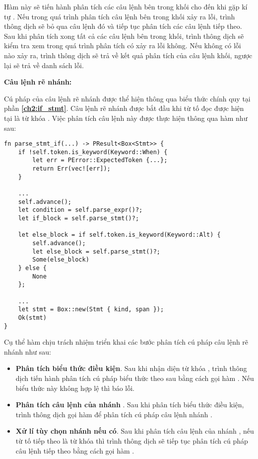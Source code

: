     Hàm này sẽ tiến hành phân tích các câu lệnh bên trong khối cho đến khi gặp kí tự \kw{\}}. Nếu trong quá trình phân tích câu lệnh bên trong khối xảy ra lỗi, trình thông dịch sẽ bỏ qua câu lệnh đó và tiếp tục phân tích các câu lệnh tiếp theo. Sau khi phân tích xong tất cả các câu lệnh bên trong khối, trình thông dịch sẽ kiểm tra xem trong quá trình phân tích có xảy ra lỗi không. Nếu không có lỗi nào xảy ra, trình thông dịch sẽ trả về kết quả phân tích của câu lệnh khối, ngược lại sẽ trả về danh sách lỗi.

\noindent\textbf{Câu lệnh rẽ nhánh:} 

Cú pháp của câu lệnh rẽ nhánh được thể hiện thông qua biểu thức chính quy tại phần \textbf{\ref{ch2:if_stmt}}. Câu lệnh rẽ nhánh được bắt đầu khi từ tố đọc được hiện tại là từ khóa . Việc phân tích câu lệnh này được thực hiện thông qua hàm  như sau:

\begin{lstlisting}[]
fn parse_stmt_if(...) -> PResult<Box<Stmt>> {
    if !self.token.is_keyword(Keyword::When) {
        let err = PError::ExpectedToken {...};
        return Err(vec![err]);
    }

    ...
    self.advance(); 
    let condition = self.parse_expr()?;
    let if_block = self.parse_stmt()?;

    let else_block = if self.token.is_keyword(Keyword::Alt) {
        self.advance();
        let else_block = self.parse_stmt()?;
        Some(else_block)
    } else {
        None
    };

    ...
    let stmt = Box::new(Stmt { kind, span });
    Ok(stmt)
}
\end{lstlisting}

Cụ thể hàm  chịu trách nhiệm triển khai các bước phân tích cú pháp câu lệnh rẽ nhánh như sau:
\begin{itemize}
    \item \textbf{Phân tích biểu thức điều kiện}. Sau khi nhận diện từ khóa , trình thông dịch tiến hành phân tích cú pháp biểu thức theo sau bằng cách gọi hàm . Nếu biểu thức này không hợp lệ thì báo lỗi.
    \item \textbf{Phân tích câu lệnh của nhánh }. Sau khi phân tích biểu thức điều kiện, trình thông dịch gọi hàm  để phân tích cú pháp câu lệnh nhánh .
    \item \textbf{Xử lí tùy chọn nhánh  nếu có}. Sau khi phân tích câu lệnh của nhánh , nếu từ tố tiếp theo là từ khóa  thì trình thông dịch sẽ tiếp tục phân tích cú pháp câu lệnh tiếp theo bằng cách gọi hàm .
\end{itemize}

